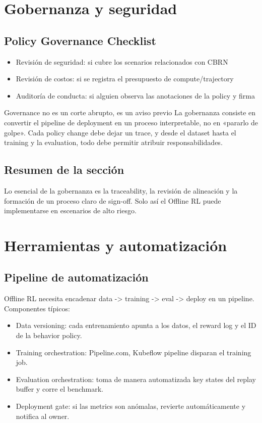 \documentclass[a4paper]{article}
\begin{document}
\section{Gobernanza y seguridad}

\subsection{Policy Governance Checklist}

\begin{itemize}
    \item Revisión de seguridad: si cubre los scenarios relacionados con CBRN
    \item Revisión de costos: si se registra el presupuesto de compute/trajectory
    \item Auditoría de conducta: si alguien observa las anotaciones de la policy y firma
\end{itemize}

\begin{knowledgebox}{Governance no es un corte abrupto, es un aviso previo}
La gobernanza consiste en convertir el pipeline de deployment en un proceso interpretable, no en «pararlo de golpe». Cada policy change debe dejar un trace, y desde el dataset hasta el training y la evaluation, todo debe permitir atribuir responsabilidades.
\end{knowledgebox}

\subsection{Resumen de la sección}

Lo esencial de la gobernanza es la traceability, la revisión de alineación y la formación de un proceso claro de sign-off. Solo así el Offline RL puede implementarse en escenarios de alto riesgo.

\section{Herramientas y automatización}

\subsection{Pipeline de automatización}

Offline RL necesita encadenar data -> training -> eval -> deploy en un pipeline. Componentes típicos:

\begin{itemize}
    \item Data versioning: cada entrenamiento apunta a los datos, el reward log y el ID de la behavior policy.
    \item Training orchestration: Pipeline.com, Kubeflow pipeline disparan el training job.
    \item Evaluation orchestration: toma de manera automatizada key states del replay buffer y corre el benchmark.
    \item Deployment gate: si las metrics son anómalas, revierte automáticamente y notifica al owner.
\end{itemize}
\end{document}
